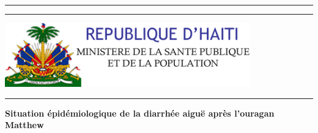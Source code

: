 \begin{titlepage}

\hspace*{-1cm}\begin{minipage}[t][0.1\textheight]{5cm}
\textcolor{whoblue!15}{\rule{5cm}{0.1\textheight}}
\end{minipage}
\hspace*{1cm}\begin{minipage}[t]{11.3cm}
\textcolor{whoblue}{\rule{11.3cm}{0.5mm}}
\end{minipage}

\hspace*{-1cm}\begin{minipage}[t][0.1\textheight]{5cm}
\vspace{0pt}
\includegraphics[height=0.1\textheight]{./figure/logo_mspp.png}\\[0.55cm]
\textcolor{whoblue!15}{\rule{5cm}{0.1\textheight}}
\end{minipage}
\hspace*{1cm}\begin{minipage}[t][0.2\textheight]{11.3cm}{}
\vspace{0pt}
\begin{flushright}
\begin{spacing}{2.0}
{\huge \textbf{Situation épidémiologique de la diarrhée aiguë après l'ouragan Matthew}}
\end{spacing}
\end{flushright}
\end{minipage}


\end{titlepage}
